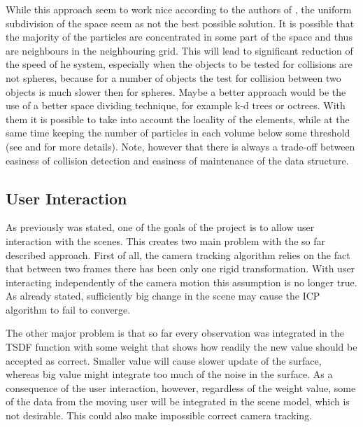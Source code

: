 \documentclass[11pt, a4paper]{article}
\theoremstyle{plain}
\begin{document}
    While this approach seem to work nice according to the authors of
    \cite{kinectfusion}, the uniform subdivision of the space seem as not the
    best possible solution. It is possible that the majority of the particles
    are concentrated in some part of the space and thus are neighbours in the
    neighbouring grid. This will lead to significant reduction of the speed of
    he system, especially when the objects to be tested for collisions are not
    spheres, because for a number of objects the test for collision between two
    objects is much slower then for spheres. Maybe a better approach would be
    the use of a better space dividing technique, for example k-d trees or
    octrees. With them it is possible to take into account the locality of the
    elements, while at the same time keeping the number of particles in each
    volume below some threshold (see \cite{fast-collision-detection} and
    \cite{collision-detection-based-on-partitioning} for more details). Note,
    however that there is always a trade-off between easiness of collision
    detection and easiness of maintenance of the data structure.

  \subsection{User Interaction} %
  \label{sub:User Interaction}
    As previously was stated, one of the goals of the project is to allow user
    interaction with the scenes. This creates two main problem with the so far
    described approach. First of all, the camera tracking algorithm relies on
    the fact that between two frames there has been only one rigid
    transformation. With user interacting independently of the camera motion
    this assumption is no longer true. As already stated, sufficiently big
    change in the scene may cause the ICP algorithm to fail to converge.

    The other major problem is that so far every observation was integrated in
    the TSDF function with some weight that shows how readily the new value
    should be accepted as correct. Smaller value will cause slower update of the
    surface, whereas big value might integrate too much of the noise in the
    surface. As a consequence of the user interaction, however, regardless of
    the weight value, some of the data from the moving user will be integrated
    in the scene model, which is not desirable. This could also make impossible
    correct camera tracking.
\end{document}
